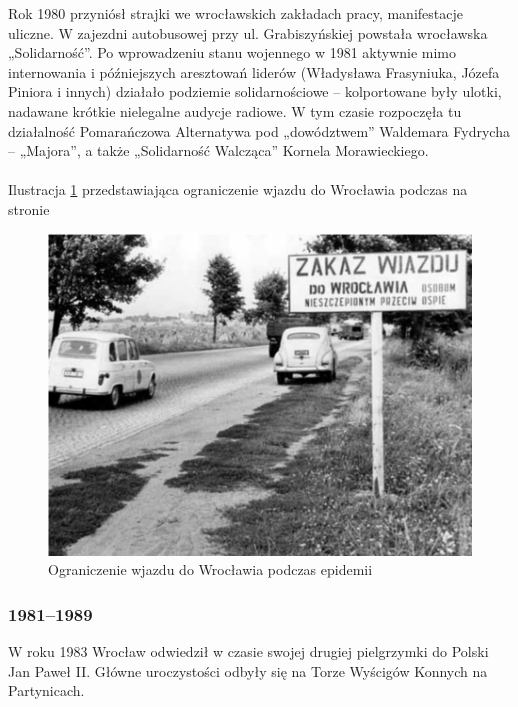 \documentclass{article}
\begin{document}
Rok 1980 przyniósł strajki we wrocławskich zakładach pracy, manifestacje uliczne. W zajezdni autobusowej przy ul. Grabiszyńskiej powstała wrocławska „Solidarność”. Po wprowadzeniu stanu wojennego w 1981 aktywnie mimo internowania i późniejszych aresztowań liderów (Władysława Frasyniuka, Józefa Piniora i innych) działało podziemie solidarnościowe – kolportowane były ulotki, nadawane krótkie nielegalne audycje radiowe. W tym czasie rozpoczęła tu działalność Pomarańczowa Alternatywa pod „dowództwem” Waldemara Fydrycha – „Majora”, a także „Solidarność Walcząca” Kornela Morawieckiego.\\
\\
Ilustracja \ref{fig:ospa} przedstawiająca ograniczenie wjazdu do Wrocławia podczas 
na stronie \pageref{fig:ospa}
\begin{figure}[h!]
\centering
\includegraphics[scale=0.6]{450px-Ospa1.png}
\caption{Ograniczenie wjazdu do Wrocławia podczas epidemii}
\label{fig:ospa}
\end{figure}

\subsubsection{1981–1989}
W roku 1983 Wrocław odwiedził w czasie swojej drugiej pielgrzymki do Polski Jan Paweł II. Główne uroczystości odbyły się na Torze Wyścigów Konnych na Partynicach.
\end{document}
